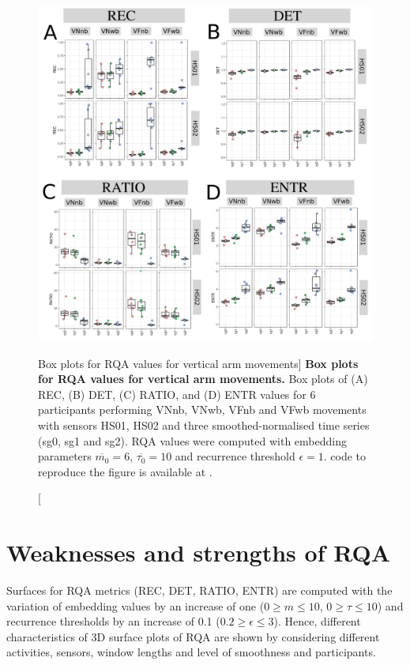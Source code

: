 \begin{figure}
\centering
\includegraphics[width=1.0\textwidth]{fig_5_14}
	\caption
	[Box plots for RQA values for vertical arm movements]{
	{\bf Box plots for RQA values for vertical arm movements.} 
 	Box plots of (A) REC, (B) DET, (C) RATIO, and (D) ENTR values 
	for 6 participants performing VNnb, VNwb, VFnb and VFwb movements
	with sensors HS01, HS02 and three smoothed-normalised  
	time series (sg0, sg1 and sg2).
	RQA values were computed with 
	embedding parameters $\overline{m_0}=6$, $\overline{\tau_0}=10$ and 
	recurrence threshold $\epsilon=1$.
	\R code to reproduce the figure is available at 
	.
        }
    \label{fig:BPRQAV}
\end{figure}

\newpage
\section{Weaknesses and strengths of RQA} \label{wsRQAhii}
Surfaces for RQA metrics (REC, DET, RATIO, ENTR) are computed with the 
variation of embedding values by an increase of one 
($0 \ge m \le 10$, $0 \ge \tau \le 10$) 
and recurrence thresholds by an increase of 0.1 ($0.2 \ge \epsilon \le 3$).
Hence, different characteristics of 3D surface plots of RQA 
are shown by considering different activities, sensors, 
window lengths and level of smoothness and participants.

